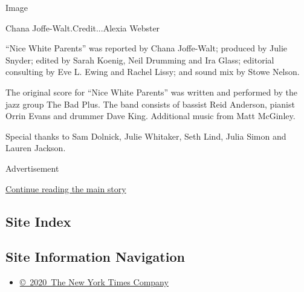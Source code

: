 Image

Chana Joffe-Walt.Credit...Alexia Webster

``Nice White Parents'' was reported by Chana Joffe-Walt; produced by
Julie Snyder; edited by Sarah Koenig, Neil Drumming and Ira Glass;
editorial consulting by Eve L. Ewing and Rachel Lissy; and sound mix by
Stowe Nelson.

The original score for ``Nice White Parents'' was written and performed
by the jazz group The Bad Plus. The band consists of bassist Reid
Anderson, pianist Orrin Evans and drummer Dave King. Additional music
from Matt McGinley.

Special thanks to Sam Dolnick, Julie Whitaker, Seth Lind, Julia Simon
and Lauren Jackson.

Advertisement

\protect\hyperlink{after-bottom}{Continue reading the main story}

\hypertarget{site-index}{%
\subsection{Site Index}\label{site-index}}

\hypertarget{site-information-navigation}{%
\subsection{Site Information
Navigation}\label{site-information-navigation}}

\begin{itemize}
\tightlist
\item
  \href{https://help.nytimes3xbfgragh.onion/hc/en-us/articles/115014792127-Copyright-notice}{©~2020~The
  New York Times Company}
\end{itemize}

